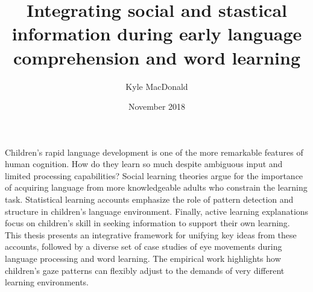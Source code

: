 \documentclass[oneside]{report}
\begin{document}
\title{Integrating social and stastical information during early language
comprehension and word learning}
\author{Kyle MacDonald}
\date{November 2018}


\makeatletter
\def\maxwidth{ %
  \ifdim\Gin@nat@width>\linewidth
    \linewidth
  \else
    \Gin@nat@width
  \fi
}
\makeatother

\renewcommand{\contentsname}{Contents}

\setlength{\parskip}{0pt}


\providecommand{\tightlist}{%
  \setlength{\itemsep}{0pt}\setlength{\parskip}{0pt}}




\beforepreface
{}
Children's rapid language development is one of the more remarkable
features of human cognition. How do they learn so much despite ambiguous
input and limited processing capabilities? Social learning theories
argue for the importance of acquiring language from more knowledgeable
adults who constrain the learning task. Statistical learning accounts
emphasize the role of pattern detection and structure in children's
language environment. Finally, active learning explanations focus on
children's skill in seeking information to support their own learning.
This thesis presents an integrative framework for unifying key ideas
from these accounts, followed by a diverse set of case studies of eye
movements during language processing and word learning. The empirical
work highlights how children's gaze patterns can flexibly adjust to the
demands of very different learning environments.
\end{document}
